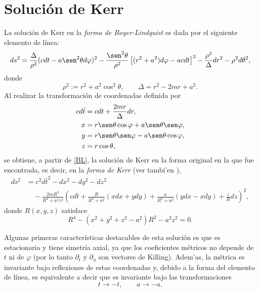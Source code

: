 \section{Soluci\'on de Kerr}
La soluci\'on de Kerr en la \textit{forma de Boyer-Lindquist} es dada por el siguiente elemento de l\'inea:
 \begin{equation}
ds^2=\frac{\Delta}{\rho^2}(cdt-a\sen^2\theta d\varphi)^2-\frac{\sen^2\theta}{\rho^2}\left[(r^2+a^2)d\varphi-acdt \right]^2-\frac{\rho^2}{\Delta}dr^2-\rho^2d\theta^2, \label{BL}
 \end{equation}
donde
\begin{equation}
\rho^2:=r^2+a^2\cos^2\theta,\qquad \Delta=r^2-2mr+a^2.
\end{equation}
Al realizar la transformaci\'on de coordenadas definida por
\begin{equation}
\begin{aligned}
cd\bar{t}&=cdt+\frac{2mr}{\Delta}dr,\\
x&=r\sen\theta\cos\varphi+a\sen\theta\sen\varphi, \\
y&=r\sen\theta\sen\varphi-a\sen\theta\cos\varphi, \\
z&=r\cos\theta,   \label{zrt}
\end{aligned}
\end{equation}
se obtiene, a partir de \eqref{BL}, la soluci\'on de Kerr en la forma original en la que fue encontrada, es decir, en la \textit{forma de Kerr} \cite{Kerr63} (ver tambi'en \cite{Kerr65}),
\begin{align}
ds^2 &= c^2d\bar{t}^2-dx^2-dy^2-dz^2 \nonumber \\
&\quad -\frac{2mR^3}{R^4+a^2z^2}\left(cd\bar{t}+\frac{R}{R^2+a^2}(xdx+ydy)+\frac{a}{R^2+a^2}(ydx-xdy)+\frac{z}{R}dz \right)^2 , \label{Kerr}
\end{align}
donde $R(x,y,z)$ satisface
\begin{equation}
R^4 - (x^2+y^2+z^2-a^2)R^2 -a^2z^2=0.
\end{equation}

Algunas primeras caracter\'isticas destacables de esta soluci\'on es que es estacionaria y tiene simetr\'ia axial, ya que los coeficientes m\'etricos no depende de $t$ ni de $\varphi$ (por lo tanto $\partial_t$ y $\partial_\phi$ son vectores de Killing). Adem'as, la m\'etrica es invariante bajo reflexiones de estas coordenadas y, debido a la forma del elemento de l\'inea, es equivalente a decir que es invariante bajo las transformaciones
\begin{equation}
t\rightarrow -t, \qquad a\rightarrow -a.
\end{equation}

